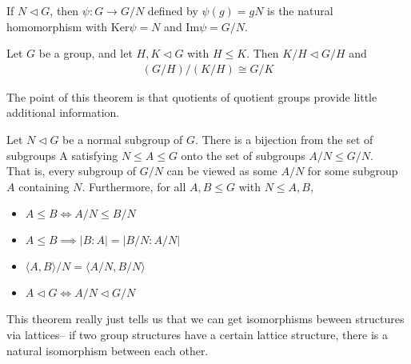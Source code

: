 \documentclass{memoir}
\begin{document}
\begin{defn}
	If \(N \triangleleft G\), then \(\psi:G \to G / N\) defined by \(\psi(g) = gN\) is the natural homomorphism with \( \textrm{Ker}\psi = N\) and \( \textrm{Im}\psi = G / N\).
\end{defn}


\begin{thm}
	Let \(G\) be a group, and let \(H,K \triangleleft G\) with \(H\leq K\). Then \(K / H \triangleleft G / H\) and
	\begin{align*}
		(G / H) / (K / H) \cong G /K
	\end{align*}
\end{thm}

The point of this theorem is that quotients of quotient groups provide little additional information.

\begin{thm}
	Let \(N \triangleleft G\) be a normal subgroup of \(G\). There is a bijection from the set of subgroups A satisfying \(N \leq A\leq G\) onto the set of subgroups \(A/N \leq G / N\).\\

	That is, every subgroup of \(G / N\) can be viewed as some \(A / N\) for some subgroup \(A\) containing \(N\). Furthermore, for all \(A,B \leq G\) with \(N\leq A,B\),
	\begin{itemize}[(i).]
		\item \(A\leq B \iff A / N \leq B / N\) 
		\item \(A\leq B \implies \left| B : A \right| = \left| B / N : A / N \right| \) 
		\item \(\langle A,B \rangle / N = \langle A / N, B / N \rangle \) 
		\item \(A \triangleleft G \iff A / N \triangleleft G / N\)
	\end{itemize}
\end{thm}
This theorem really just tells us that we can get isomorphisms beween structures via lattices-- if two group structures have a certain lattice structure, there is a natural isomorphism between each other.

\end{document}
